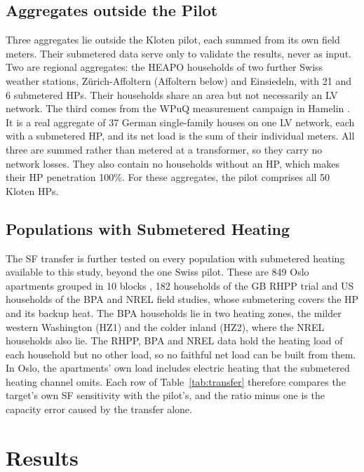 \subsection{Aggregates outside the Pilot}
\label{sec:data-real}

Three aggregates lie outside the Kloten pilot, each summed from its own field meters. Their submetered data serve only to validate the results, never as input. Two are regional aggregates: the HEAPO households of two further Swiss weather stations, Z{\"u}rich-Affoltern (Affoltern below) and Einsiedeln, with 21 and 6 submetered HPs. Their households share an area but not necessarily an LV network. The third comes from the WPuQ measurement campaign in Hamelin \cite{Sch22}. It is a real aggregate of 37 German single-family houses on one LV network, each with a submetered HP, and its net load is the sum of their individual meters. All three are summed rather than metered at a transformer, so they carry no network losses. They also contain no households without an HP, which makes their HP penetration 100\%. For these aggregates, the pilot comprises all 50 Kloten HPs.

\subsection{Populations with Submetered Heating}
\label{sec:data-pop}

The SF transfer is further tested on every population with submetered heating available to this study, beyond the one Swiss pilot. These are 849 Oslo apartments grouped in 10 blocks \cite{cofactor}, 182 households of the GB RHPP trial \cite{rhpp8151, Lov17} and US households of the BPA \cite{bpa_hphc} and NREL \cite{nrel_ccashp} field studies, whose submetering covers the HP and its backup heat. The BPA households lie in two heating zones, the milder western Washington (HZ1) and the colder inland (HZ2), where the NREL households also lie. The RHPP, BPA and NREL data hold the heating load of each household but no other load, so no faithful net load can be built from them. In Oslo, the apartments' own load includes electric heating that the submetered heating channel omits. Each row of Table~\ref{tab:transfer} therefore compares the target's own SF sensitivity with the pilot's, and the ratio minus one is the capacity error caused by the transfer alone.

\section{Results}
\label{sec:results}

